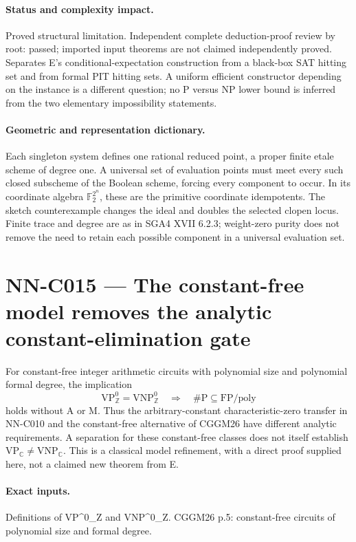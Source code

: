 \paragraph{Status and complexity impact.}
Proved structural limitation. Independent complete deduction-proof review by root: passed; imported input theorems are not claimed independently proved. Separates E's conditional-expectation construction from a black-box SAT hitting set and from formal PIT hitting sets. A uniform efficient constructor depending on the instance is a different question; no P versus NP lower bound is inferred from the two elementary impossibility statements.

\paragraph{Geometric and representation dictionary.}
Each singleton system defines one rational reduced point, a proper finite etale scheme of degree one. A universal set of evaluation points must meet every such closed subscheme of the Boolean scheme, forcing every component to occur. In its coordinate algebra $\mathbb F_2^{2^n}$, these are the primitive coordinate idempotents. The sketch counterexample changes the ideal and doubles the selected clopen locus. Finite trace and degree are as in SGA4 XVII 6.2.3; weight-zero purity does not remove the need to retain each possible component in a universal evaluation set.



\section{NN-C015 --- The constant-free model removes the analytic constant-elimination gate}
\begin{proposition}[NN-C015]
For constant-free integer arithmetic circuits with polynomial size and polynomial formal degree, the implication
\[
 \mathrm{VP}_{\mathbb Z}^{0}=\mathrm{VNP}_{\mathbb Z}^{0}
 \quad\Longrightarrow\quad \#\mathrm P\subseteq\mathrm{FP}/\mathrm{poly}
\]
holds without A or M. Thus the arbitrary-constant characteristic-zero transfer in NN-C010 and the constant-free alternative of CGGM26 have different analytic requirements. A separation for these constant-free classes does not itself establish $\mathrm{VP}_{\mathbb C}\ne\mathrm{VNP}_{\mathbb C}$. This is a classical model refinement, with a direct proof supplied here, not a claimed new theorem from E.
\end{proposition}
\paragraph{Exact inputs.}
Definitions of VP\textasciicircum{}0\_Z and VNP\textasciicircum{}0\_Z. CGGM26 p.5: constant-free circuits of polynomial size and formal degree.

